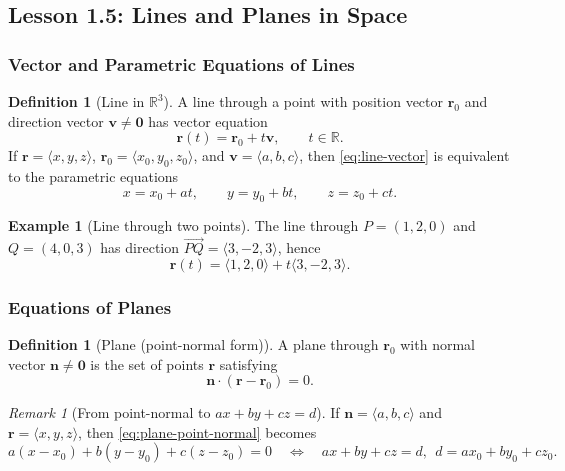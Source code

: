 \documentclass[12pt]{article}
\numberwithin{equation}{section}
\newcommand{\RR}{\mathbb{R}}
\newcommand{\vect}[1]{\boldsymbol{#1}}   %
\theoremstyle{plain}
\theoremstyle{definition}
\newtheorem{definition}[theorem]{Definition}
\newtheorem{example}[theorem]{Example}
\theoremstyle{remark}
\newtheorem{remark}[theorem]{Remark}
\begin{document}
\subsection{Lesson 1.5: Lines and Planes in Space}

\subsubsection{Vector and Parametric Equations of Lines}

\begin{definition}[Line in $\RR^3$]
A line through a point with position vector $\vect{r}_0$ and direction vector $\vect{v}\neq \vect{0}$ has vector equation
\begin{equation}\label{eq:line-vector}
\vect{r}(t)=\vect{r}_0+t\vect{v},\qquad t\in\RR.
\end{equation}
If $\vect{r}=\langle x,y,z\rangle$, $\vect{r}_0=\langle x_0,y_0,z_0\rangle$, and $\vect{v}=\langle a,b,c\rangle$, then \cref{eq:line-vector} is equivalent to the parametric equations
\begin{equation}\label{eq:line-param}
x=x_0+at,\qquad y=y_0+bt,\qquad z=z_0+ct.
\end{equation}
\end{definition}

\begin{example}[Line through two points]
The line through $P=(1,2,0)$ and $Q=(4,0,3)$ has direction $\overrightarrow{PQ}=\langle 3,-2,3\rangle$, hence
\[
\vect{r}(t)=\langle 1,2,0\rangle+t\langle 3,-2,3\rangle.
\]
\end{example}

\subsubsection{Equations of Planes}

\begin{definition}[Plane (point-normal form)]
A plane through $\vect{r}_0$ with normal vector $\vect{n}\neq \vect{0}$ is the set of points $\vect{r}$ satisfying
\begin{equation}\label{eq:plane-point-normal}
\vect{n}\cdot(\vect{r}-\vect{r}_0)=0.
\end{equation}
\end{definition}

\begin{remark}[From point-normal to $ax+by+cz=d$]
If $\vect{n}=\langle a,b,c\rangle$ and $\vect{r}=\langle x,y,z\rangle$, then \cref{eq:plane-point-normal} becomes
\[
a(x-x_0)+b(y-y_0)+c(z-z_0)=0
\quad\Longleftrightarrow\quad
ax+by+cz=d,\ \ d=ax_0+by_0+cz_0.
\]
\end{remark}
\end{document}
